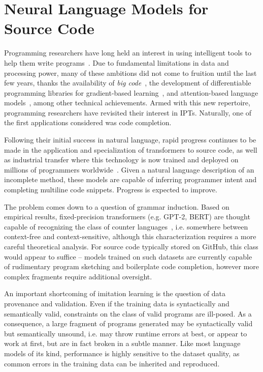 \documentclass[10pt]{article}
\begin{document}
  \section{Neural Language Models for Source Code}

Programming researchers have long held an interest in using intelligent tools to help them write programs~\cite{bras1993artificial}. Due to fundamental limitations in data and processing power, many of these ambitions did not come to fruition until the last few years, thanks the availability of \textit{big code}~\cite{allamanis2018survey}, the development of differentiable programming libraries for gradient-based learning~\cite{baydin2018automatic}, and attention-based language models~\cite{vaswani2017attention}, among other technical achievements. Armed with this new repertoire, programming researchers have revisited their interest in IPTs. Naturally, one of the first applications considered was code completion.

 Following their initial success in natural language, rapid progress continues to be made in the application and specialization of transformers to source code, as well as industrial transfer where this technology is now trained and deployed on millions of programmers worldwide~\cite{chen2021evaluating}. Given a natural language description of an incomplete method, these models are capable of inferring programmer intent and completing multiline code snippets. Progress is expected to improve.

The problem comes down to a question of grammar induction. Based on empirical results, fixed-precision transformers (e.g. GPT-2, BERT) are thought capable of recognizing the class of counter languages~\cite{bhattamishra2020ability}, i.e. somewhere between context-free and context-sensitive, although this characterization requires a more careful theoretical analysis. For source code typically stored on GitHub, this class would appear to suffice -- models trained on such datasets are currently capable of rudimentary program sketching and boilerplate code completion, however more complex fragments require additional oversight.

An important shortcoming of imitation learning is the question of data provenance and validation. Even if the training data is syntactically and semantically valid, constraints on the class of valid programs are ill-posed. As a consequence, a large fragment of programs generated may be syntactically valid but semantically unsound, i.e. may throw runtime errors at best, or appear to work at first, but are in fact broken in a subtle manner. Like most language models of its kind, performance is highly sensitive to the dataset quality, as common errors in the training data can be inherited and reproduced.
\end{document}
